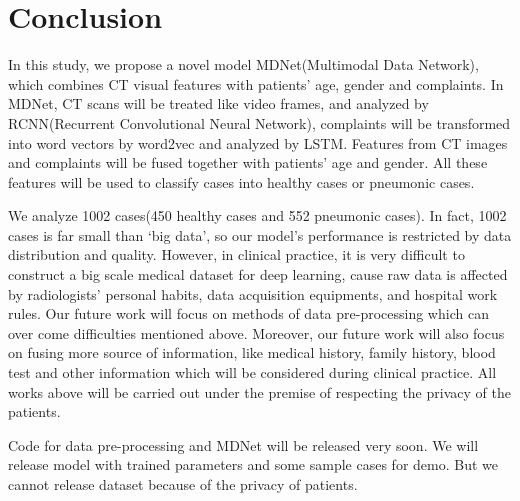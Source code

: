 \documentclass[journal]{IEEEtran}
\begin{document}
\section{Conclusion}
\label{conclude}
In this study, we propose a novel model MDNet(Multimodal Data Network), which combines CT visual features with patients' age, gender and complaints. In MDNet, CT scans will be treated like video frames, and analyzed by RCNN(Recurrent Convolutional Neural Network), complaints will be transformed into word vectors by word2vec and analyzed by LSTM. Features from CT images and complaints will be fused together with patients' age and gender. All these features will be used to classify cases into healthy cases or pneumonic cases.

We analyze 1002 cases(450 healthy cases and 552 pneumonic cases). In fact, 1002 cases is far small than `big data', so our model's performance is restricted by data distribution and quality. However, in clinical practice, it is very difficult to construct a big scale medical dataset for deep learning, cause raw data is affected by radiologists' personal habits, data acquisition equipments, and hospital work rules. Our future work will focus on methods of data pre-processing which can over come difficulties mentioned above.
Moreover, our future work will also focus on fusing more source of information, like medical history, family history, blood test and other information which will be considered during clinical practice. All works above will be carried out under the premise of respecting the privacy of the patients.
 
Code for data pre-processing and MDNet will be released very soon. We will release model with trained parameters and some sample cases for demo. But we cannot release dataset because of the privacy of patients. 


%
%
\end{document}
